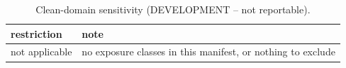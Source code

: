 \begin{table}[htbp]
\centering
\small
\begin{tabular}{ll}
\toprule
\textbf{restriction} & \textbf{note} \\
\midrule
not applicable & no exposure classes in this manifest, or nothing to exclude \\
\bottomrule
\end{tabular}
\caption{Clean-domain sensitivity (DEVELOPMENT -- not reportable).}
\end{table}
